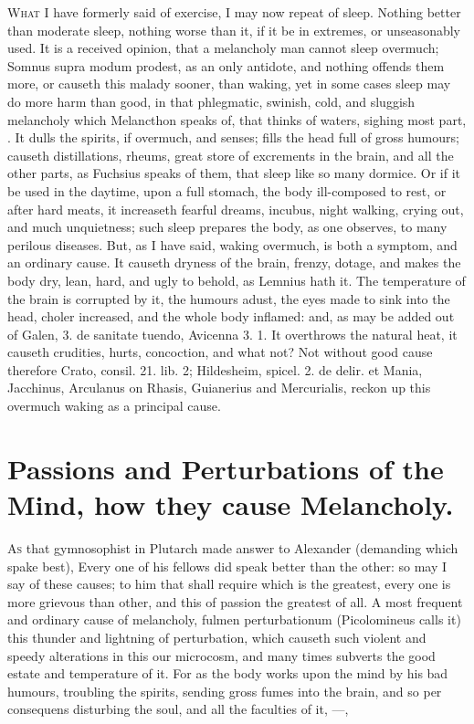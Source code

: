 {{\lettrine{W}{hat} I have formerly said of exercise, I may now repeat of sleep.
Nothing better than moderate sleep, nothing worse than it, if it be in
extremes, or unseasonably used. It is a received opinion, that a
melancholy man cannot sleep overmuch; Somnus supra modum prodest, as an
only antidote, and nothing offends them more, or causeth this malady
sooner, than waking, yet in some cases sleep may do more harm than
good, in that phlegmatic, swinish, cold, and sluggish melancholy which
Melancthon speaks of, that thinks of waters, sighing most part, \etc{}.
It dulls the spirits, if overmuch, and senses; fills the head
full of gross humours; causeth distillations, rheums, great store of
excrements in the brain, and all the other parts, as Fuchsius
speaks of them, that sleep like so many dormice. Or if it be used in
the daytime, upon a full stomach, the body ill-composed to rest, or
after hard meats, it increaseth fearful dreams, incubus, night walking,
crying out, and much unquietness; such sleep prepares the body, as
one observes, to many perilous diseases. But, as I have said,
waking overmuch, is both a symptom, and an ordinary cause. It causeth
dryness of the brain, frenzy, dotage, and makes the body dry, lean,
hard, and ugly to behold, as Lemnius hath it. The temperature of
the brain is corrupted by it, the humours adust, the eyes made to sink
into the head, choler increased, and the whole body inflamed: and, as
may be added out of Galen, 3. de sanitate tuendo, Avicenna 3. 1.
It overthrows the natural heat, it causeth crudities, hurts,
concoction, and what not? Not without good cause therefore Crato,
consil. 21. lib. 2; Hildesheim, spicel. 2. de delir. et Mania,
Jacchinus, Arculanus on Rhasis, Guianerius and Mercurialis, reckon up
this overmuch waking as a principal cause.


\section{Passions and Perturbations of the Mind, how they cause Melancholy.}

\lettrine{A}{s} that gymnosophist in Plutarch made answer to Alexander
(demanding which spake best), Every one of his fellows did speak better
than the other: so may I say of these causes; to him that shall require
which is the greatest, every one is more grievous than other, and this
of passion the greatest of all. A most frequent and ordinary cause of
melancholy,  fulmen perturbationum (Picolomineus calls it) this
thunder and lightning of perturbation, which causeth such violent and
speedy alterations in this our microcosm, and many times subverts the
good estate and temperature of it. For as the body works upon the mind
by his bad humours, troubling the spirits, sending gross fumes into the
brain, and so per consequens disturbing the soul, and all the faculties
of it,
---,

}}
